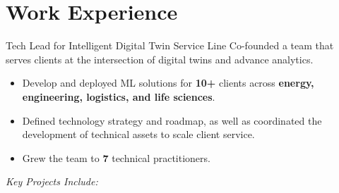 \documentclass[a4paper]{deedy-resume} %
\begin{document}
\section{Work Experience}
\vspace{-5pt}
\begin{callout}{Tech Lead for Intelligent Digital Twin Service Line}
\linebreak
    Co-founded a team that serves clients at the intersection of digital twins and advance analytics.
    \vspace{-10pt}
    \begin{multicols}{2}
        \begin{itemize}
            \item Develop and deployed ML solutions for \textbf{10+} clients across \textbf{energy, engineering, logistics, and life sciences}. 
            \columnbreak
            \item Defined technology strategy and roadmap, as well as coordinated the development of technical assets to scale client service. 
            \item Grew the team to \textbf{7} technical practitioners.
        \end{itemize}
    \end{multicols}
\end{callout}
\vspace{-2pt}
\textit{Key Projects Include:}
\vspace{-10pt}
\end{document}
